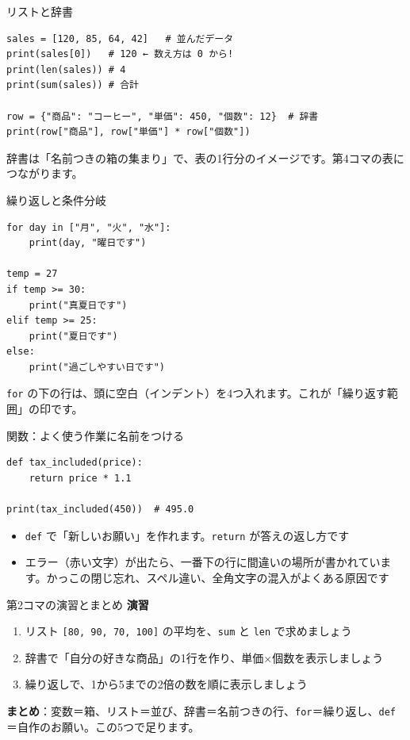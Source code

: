 \documentclass[aspectratio=169,11pt]{beamer}
\begin{document}
\begin{frame}[fragile]{リストと辞書}
\begin{lstlisting}
sales = [120, 85, 64, 42]   # 並んだデータ
print(sales[0])   # 120 ← 数え方は 0 から!
print(len(sales)) # 4
print(sum(sales)) # 合計

row = {"商品": "コーヒー", "単価": 450, "個数": 12}  # 辞書
print(row["商品"], row["単価"] * row["個数"])
\end{lstlisting}
辞書は「名前つきの箱の集まり」で、表の1行分のイメージです。第4コマの表につながります。
\end{frame}

\begin{frame}[fragile]{繰り返しと条件分岐}
\begin{lstlisting}
for day in ["月", "火", "水"]:
    print(day, "曜日です")

temp = 27
if temp >= 30:
    print("真夏日です")
elif temp >= 25:
    print("夏日です")
else:
    print("過ごしやすい日です")
\end{lstlisting}
\texttt{for} の下の行は、頭に空白（インデント）を4つ入れます。これが「繰り返す範囲」の印です。
\end{frame}

\begin{frame}[fragile]{関数：よく使う作業に名前をつける}
\begin{lstlisting}
def tax_included(price):
    return price * 1.1

print(tax_included(450))  # 495.0
\end{lstlisting}
\begin{itemize}
\item \texttt{def} で「新しいお願い」を作れます。\texttt{return} が答えの返し方です
\item エラー（赤い文字）が出たら、一番下の行に間違いの場所が書かれています。かっこの閉じ忘れ、スペル違い、全角文字の混入がよくある原因です
\end{itemize}
\end{frame}

\begin{frame}{第2コマの演習とまとめ}
\textbf{演習}
\begin{enumerate}
\item リスト \texttt{[80, 90, 70, 100]} の平均を、\texttt{sum} と \texttt{len} で求めましょう
\item 辞書で「自分の好きな商品」の1行を作り、単価×個数を表示しましょう
\item 繰り返しで、1から5までの2倍の数を順に表示しましょう
\end{enumerate}
\vspace{0.5em}
\textbf{まとめ}：変数＝箱、リスト＝並び、辞書＝名前つきの行、\texttt{for}＝繰り返し、\texttt{def}＝自作のお願い。この5つで足ります。
\end{frame}
\end{document}
